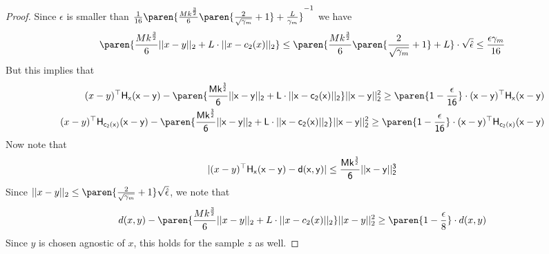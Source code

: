 \begin{proof}
    Since $\epsilon$ is smaller than $\frac{1}{16}\paren{\frac{M k^{\frac{3}{2}}}{6}\paren{\frac{2}{\sqrt{\gamma_m}} + 1} + \frac{L}{\gamma_m}}^{-1}$ we have 
    \begin{align*}
        \paren{\frac{M k^{\frac{3}{2}}}{6}||x - y||_2 + L\cdot ||x - c_2(x)||_2} \le \paren{\frac{M k^{\frac{3}{2}}}{6}\paren{\frac{2}{\sqrt{\gamma_m}} + 1} + L}\cdot \sqrt{\hat{\epsilon}} \le \frac{\epsilon\gamma_m}{16}
    \end{align*}
    But this implies that 
    \begin{align*}
        (x-y)^{\top}\sf{H}_{x}(x-y) -\paren{\frac{M k^{\frac{3}{2}}}{6}||x - y||_2 + L\cdot ||x - c_2(x)||_2} ||x - y||_2^2 \ge \paren{1 - \frac{\epsilon}{16}}\cdot (x-y)^{\top}\sf{H}_{x}(x-y)\\
        (x-y)^{\top}\sf{H}_{c_2(x)}(x-y) -\paren{\frac{M k^{\frac{3}{2}}}{6}||x - y||_2 + L\cdot ||x - c_2(x)||_2} ||x - y||_2^2 \ge \paren{1 - \frac{\epsilon}{16}}\cdot (x-y)^{\top}\sf{H}_{c_2(x)}(x-y)
    \end{align*}
    Now note that 
    \begin{align*}
        |(x-y)^{\top}\sf{H}_{x}(x-y) - d(x,y)| \le \frac{M k^{\frac{3}{2}}}{6}||x - y||_2^3
    \end{align*}
    Since $||x - y||_2 \le \paren{\frac{2}{\sqrt{\gamma_m}} + 1}\sqrt{\hat{\epsilon}}$, we note that  
    \begin{align*}
        d(x,y) -\paren{\frac{M k^{\frac{3}{2}}}{6}||x - y||_2 + L\cdot ||x - c_2(x)||_2} ||x - y||_2^2 \ge \paren{1 - \frac{\epsilon}{8}}\cdot d(x,y)
    \end{align*}
    Since $y$ is chosen agnostic of $x$, this holds for the sample $z$ as well.
    

\end{proof}
